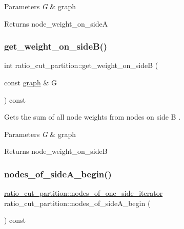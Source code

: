 \begin{DoxyParams}{Parameters}
{\em G} & graph \\
\hline
\end{DoxyParams}
\begin{DoxyReturn}{Returns}
{\ttfamily node\+\_\+weight\+\_\+on\+\_\+sideA} 
\end{DoxyReturn}
\mbox{\label{classratio__cut__partition_abd0835eeaec80f5ba56de5428985259f}} 
\subsubsection{\texorpdfstring{get\+\_\+weight\+\_\+on\+\_\+side\+B()}{get\_weight\_on\_sideB()}}
{\footnotesize\ttfamily int ratio\+\_\+cut\+\_\+partition\+::get\+\_\+weight\+\_\+on\+\_\+sideB (\begin{DoxyParamCaption}\item[{const \mbox{\hyperlink{classgraph}{graph}} \&}]{G }\end{DoxyParamCaption}) const}

Gets the sum of all node weights from nodes on side {\ttfamily B }.


\begin{DoxyParams}{Parameters}
{\em G} & graph \\
\hline
\end{DoxyParams}
\begin{DoxyReturn}{Returns}
{\ttfamily node\+\_\+weight\+\_\+on\+\_\+sideB} 
\end{DoxyReturn}
\mbox{\label{classratio__cut__partition_a0c569bb7bd0a94269bd8938a2e0fce85}} 
\subsubsection{\texorpdfstring{nodes\+\_\+of\+\_\+side\+A\+\_\+begin()}{nodes\_of\_sideA\_begin()}}
{\footnotesize\ttfamily \mbox{\hyperlink{classratio__cut__partition_a4f667099b56ded1bfef8f1fb4d09f81c}{ratio\+\_\+cut\+\_\+partition\+::nodes\+\_\+of\+\_\+one\+\_\+side\+\_\+iterator}} ratio\+\_\+cut\+\_\+partition\+::nodes\+\_\+of\+\_\+side\+A\+\_\+begin (\begin{DoxyParamCaption}{ }\end{DoxyParamCaption}) const}

